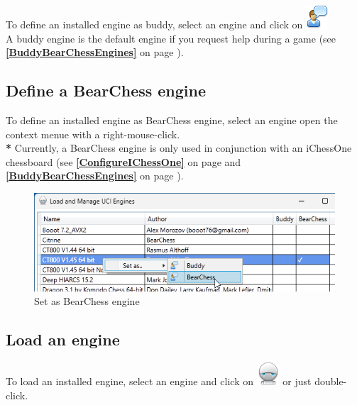 \documentclass[11pt,a4paper]{article}
\begin{document}
To define an installed engine as buddy, select an engine and click on \includegraphics[scale=0.5]{user_comment.png}\\
A buddy engine is the default engine if you request help during a game (see \textbf{\ref{BuddyBearChessEngines}  } on page \pageref{BuddyBearChessEngines}).


\subsection{Define a BearChess engine} \label{BearChessEngine}

To define an installed engine as BearChess engine, select an engine open the context menue with a right-mouse-click.\\
{\color{red}\textbf{*}} Currently, a BearChess engine is only used in conjunction with an iChessOne chessboard (see \textbf{\ref{ConfigureIChessOne}  } on page \pageref{ConfigureIChessOne} and \textbf{\ref{BuddyBearChessEngines}  } on page \pageref{BuddyBearChessEngines}).

\begin{figure}[H]
	\centering
	\includegraphics[scale=0.8]{BearChessEngine1.png}
	\caption{Set as BearChess engine}
	\label{fig:BearChessEngine1}
\end{figure}


\subsection{Load an engine}

To load an installed engine, select an engine and click on \includegraphics[scale=0.5]{robot.png} or just double-click.
\end{document}
